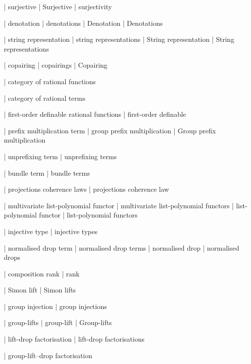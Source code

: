  | surjective
 | Surjective
 | surjectivity





 | denotation
 | denotations
 | Denotation
 | Denotations

 | string representation
 | string representations
 | String representation
 | String representations

 | copairing
 | copairings
 | Copairing

 | category of rational functions

 | category of rational terms

 | first-order definable rational functions
 | first-order definable

 | prefix multiplication term
 | group prefix multiplication
 | Group prefix multiplication

 | unprefixing term
 | unprefixing terms

 | bundle term
 | bundle terms

 | projections coherence laws
 | projections coherence law

 | multivariate list-polynomial functor
 | multivariate list-polynomial functors
 | list-polynomial functor
 | list-polynomial functors

 | injective type
 | injective types

 | normalised drop term
 | normalised drop terms
 | normalised drop
 | normalised drops

 | composition rank
 | rank

 | Simon lift
 | Simon lifts

 | group injection
 | group injections

 | group-lifts
 | group-lift
 | Group-lifts

 | lift-drop factorisation
 | lift-drop factorisations

 | group-lift--drop factorisation
